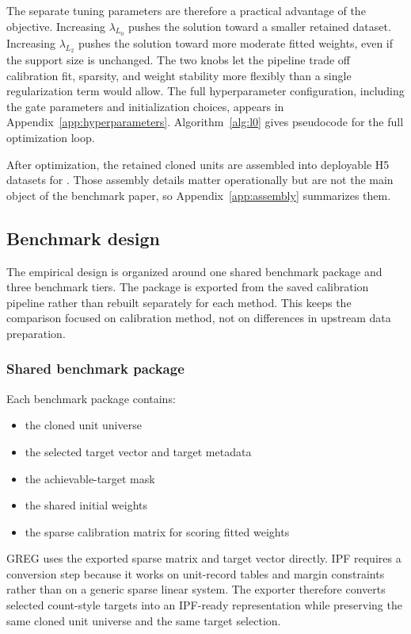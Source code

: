 The separate tuning parameters are therefore a practical advantage of the objective. Increasing
$\lambda_{L_0}$ pushes the solution toward a smaller retained dataset. Increasing $\lambda_{L_2}$
pushes the solution toward more moderate fitted weights, even if the support size is unchanged. The
two knobs let the pipeline trade off calibration fit, sparsity, and weight stability more flexibly
than a single regularization term would allow. The full hyperparameter configuration, including the
gate parameters and initialization choices, appears in Appendix~\ref{app:hyperparameters}.
Algorithm~\ref{alg:l0} gives pseudocode for the full optimization loop.

After optimization, the retained cloned units are assembled into deployable H5 datasets for
\policyengine{}. Those assembly details matter operationally but are not the main object of the
benchmark paper, so Appendix~\ref{app:assembly} summarizes them.

\subsection{Benchmark design}
\label{sec:benchmark_design}

The empirical design is organized around one shared benchmark package and three benchmark tiers.
The package is exported from the saved calibration pipeline rather than rebuilt separately for each
method. This keeps the comparison focused on calibration method, not on differences in upstream
data preparation.

\subsubsection{Shared benchmark package}

Each benchmark package contains:

\begin{itemize}
    \item the cloned unit universe
    \item the selected target vector and target metadata
    \item the achievable-target mask
    \item the shared initial weights
    \item the sparse calibration matrix for scoring fitted weights
\end{itemize}

GREG uses the exported sparse matrix and target vector directly. IPF requires a conversion step
because it works on unit-record tables and margin constraints rather than on a generic sparse linear
system. The exporter therefore converts selected count-style targets into an IPF-ready
representation while preserving the same cloned unit universe and the same target selection.

